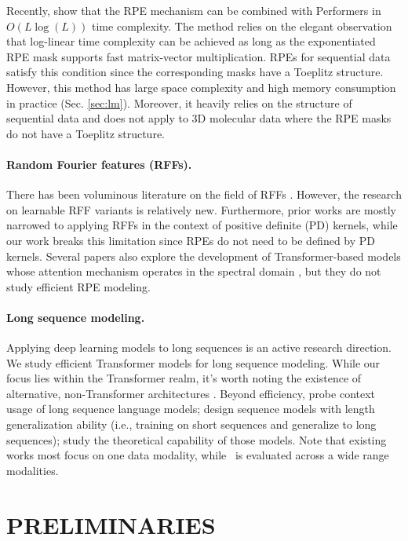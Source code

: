 Recently, \cite{rpe-performers, topmasking} show that the RPE mechanism can be combined with Performers in $O(L\log(L))$ time complexity. The method relies on the elegant observation that log-linear time complexity can be achieved as long as the exponentiated RPE mask supports fast matrix-vector multiplication. RPEs for sequential data satisfy this condition since the corresponding masks have a Toeplitz structure. However, this method has large space complexity and high memory consumption in practice (Sec. \ref{sec:lm}). 
Moreover, it heavily relies on the structure of sequential data and does not apply to 3D molecular data where the RPE masks do not have a Toeplitz structure.

\paragraph{Random Fourier features (RFFs).} There has been voluminous literature on the field of RFFs \cite{rahimi, kapralov-rfs, szabo, li-rfs, hybrid_rfs, crts, tr-kernel}. However, the research on learnable RFF variants \cite{learning-rfs-1} is relatively new. Furthermore, prior works are mostly narrowed to applying RFFs in the context of positive definite (PD) kernels, while our work breaks this limitation since RPEs do not need to be defined by PD kernels. Several papers also explore the development of Transformer-based models whose attention mechanism operates in the spectral domain \cite{tamkin2020language, moreno2023deep}, but they do not study efficient RPE modeling.

\paragraph{Long sequence modeling.} Applying deep learning models to long sequences is an active research direction. 
We study efficient Transformer models for long sequence modeling. 
While our focus lies within the Transformer realm, it's worth noting the existence of alternative, non-Transformer architectures \cite{ham,bello2021lambdanetworks, s4}. 
Beyond efficiency, \cite{o2021context, liu2024lost} probe context usage of long sequence language models; \cite{press2022train, ruoss2023randomized, li2024functional} design sequence models with length generalization ability (i.e., training on short sequences and generalize to long sequences); \cite{yun2020n, yang2024efficient} study the theoretical capability of those models. 
Note that existing works most focus on one data modality, while \FLT~is evaluated across a wide range modalities.\section{PRELIMINARIES}
\label{sec:preliminaries}
